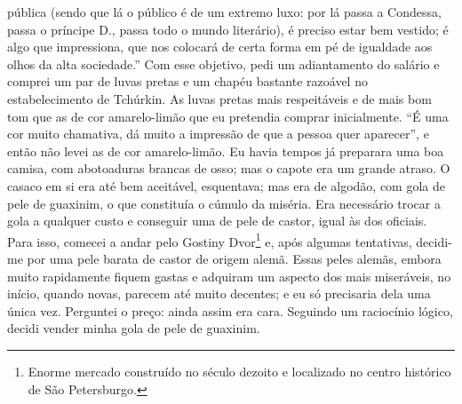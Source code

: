 pública (sendo que lá o público é de um extremo luxo: por lá passa a
Condessa, passa o príncipe D., passa todo o mundo literário), é preciso
estar bem vestido; é algo que impressiona, que nos colocará de certa
forma em pé de igualdade aos olhos da alta sociedade.” Com esse
objetivo, pedi um adiantamento do salário e comprei um par de luvas
pretas e um chapéu bastante razoável no estabelecimento de Tchúrkin. As
luvas pretas mais respeitáveis e de mais bom tom que as de cor
amarelo-limão que eu pretendia comprar inicialmente. “É uma cor muito
chamativa, dá muito a impressão de que a pessoa quer aparecer”, e então
não levei as de cor amarelo-limão. Eu havia tempos já preparara uma boa
camisa, com abotoaduras brancas de osso; mas o capote era um grande
atraso. O casaco em si era até bem aceitável, esquentava; mas era de
algodão, com gola de pele de guaxinim, o que constituía o cúmulo da
miséria. Era necessário trocar a gola a qualquer custo e conseguir uma
de pele de castor, igual às dos oficiais. Para isso, comecei a andar
pelo Gostiny Dvor\footnote{ Enorme mercado construído no século dezoito e
localizado no centro histórico de São Petersburgo.} 
e, após algumas tentativas, decidi-me por uma
pele barata de castor de origem alemã. Essas peles alemãs, embora muito
rapidamente fiquem gastas e adquiram um aspecto dos mais miseráveis, no
início, quando novas, parecem até muito decentes; e eu só precisaria
dela uma única vez. Perguntei o preço: ainda assim era cara. Seguindo
um raciocínio lógico, decidi vender minha gola de pele de guaxinim.

